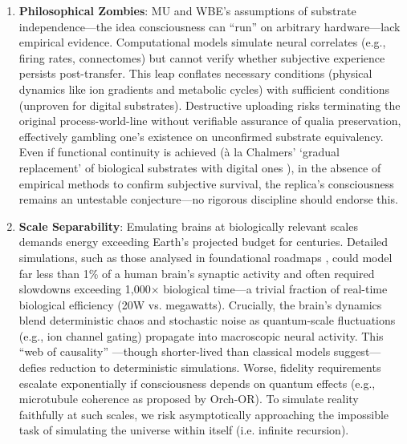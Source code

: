 \documentclass[10pt]{article}
\begin{document}
\begin{sloppypar}
  \newpage

  \begin{enumerate}
    \item \textbf{Philosophical Zombies}: MU and WBE’s assumptions of substrate independence—the idea consciousness can “run” on arbitrary hardware—lack empirical evidence. Computational models simulate neural correlates (e.g., firing rates, connectomes) but cannot verify whether subjective experience persists post-transfer. This leap conflates necessary conditions (physical dynamics like ion gradients and metabolic cycles) with sufficient conditions (unproven for digital substrates). Destructive uploading risks terminating the original process-world-line without verifiable assurance of qualia preservation, effectively gambling one’s existence on unconfirmed substrate equivalency. Even if functional continuity is achieved (à la Chalmers’ ‘gradual replacement’ of biological substrates with digital ones \citep{chalmers_conscious_1998}), in the absence of empirical methods to confirm subjective survival, the replica’s consciousness remains an untestable conjecture—no rigorous discipline should endorse this.

    \item \textbf{Scale Separability}: Emulating brains at biologically relevant scales demands energy exceeding Earth’s projected budget for centuries. Detailed simulations, such as those analysed in foundational roadmaps \citep{bostrom_whole_2008}, could model far less than 1\% of a human brain’s synaptic activity and often required slowdowns exceeding 1,000\(\times\) biological time—a trivial fraction of real-time biological efficiency (20W vs. megawatts). Crucially, the brain’s dynamics blend deterministic chaos and stochastic noise as quantum-scale fluctuations (e.g., ion channel gating) propagate into macroscopic neural activity. This “web of causality” \citep{watanabe_biological_2022}—though shorter-lived than classical models suggest—defies reduction to deterministic simulations. Worse, fidelity requirements escalate exponentially if consciousness depends on quantum effects (e.g., microtubule coherence as proposed by Orch-OR). To simulate reality faithfully at such scales, we risk asymptotically approaching the impossible task of simulating the universe within itself (i.e. infinite recursion).


\end{enumerate}
\end{sloppypar}
\end{document}
